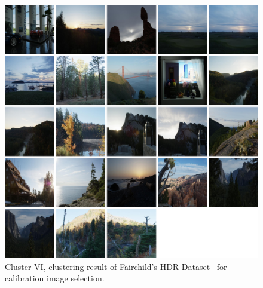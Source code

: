 \begin{figure}
\begin{center}
\includegraphics[width=\textwidth]{appendix1/cluster6.png}
\caption{Cluster VI, clustering result of Fairchild's HDR Dataset~\cite{fairchild2007hdr} for calibration image selection.}
\end{center}
\end{figure}